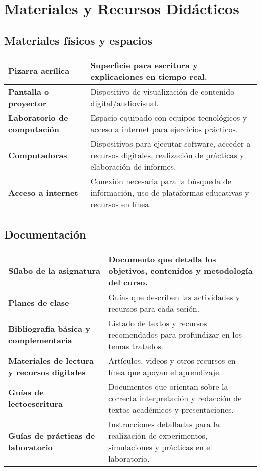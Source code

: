 \section{Materiales y Recursos Didácticos}

\subsection*{Materiales físicos y espacios}

\begin{xltabular}{\linewidth}{@{}>{\bfseries}X X@{}}
    \toprule
    Pizarra acrílica & Superficie para escritura y explicaciones en tiempo real. \\
    \midrule
    Pantalla o proyector & Dispositivo de visualización de contenido digital/audiovisual. \\
    \midrule
    Laboratorio de computación & Espacio equipado con equipos tecnológicos y acceso a internet para ejercicios prácticos. \\
    \midrule
    Computadoras & Dispositivos para ejecutar software, acceder a recursos digitales, realización de prácticas y elaboración de informes. \\
    \midrule
    Acceso a internet & Conexión necesaria para la búsqueda de información, uso de plataformas educativas y recursos en línea. \\
    \bottomrule
\end{xltabular}

\subsection*{Documentación}

\begin{xltabular}{\linewidth}{@{}>{\bfseries}X X@{}}
    \toprule
    Sílabo de la asignatura & Documento que detalla los objetivos, contenidos y metodología del curso. \\
    \midrule
    Planes de clase & Guías que describen las actividades y recursos para cada sesión. \\
    \midrule
    Bibliografía básica y complementaria & Listado de textos y recursos recomendados para profundizar en los temas tratados. \\
    \midrule
    Materiales de lectura y recursos digitales & Artículos, videos y otros recursos en línea que apoyan el aprendizaje. \\
    \midrule
    Guías de lectoescritura & Documentos que orientan sobre la correcta interpretación y redacción de textos académicos y presentaciones. \\
    \midrule
    Guías de prácticas de laboratorio & Instrucciones detalladas para la realización de experimentos, simulaciones y prácticas en el laboratorio. \\
    \bottomrule
\end{xltabular}

